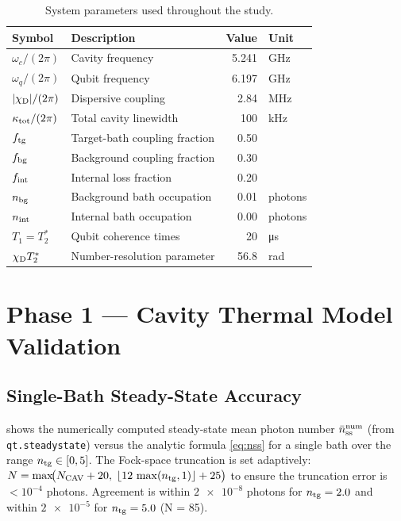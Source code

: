 \documentclass[11pt,a4paper]{article}
\newcommand{\nbar}{\bar{n}}
\newcommand{\kappat}{\kappa_{\rm tot}}
\newcommand{\ntg}{n_{\rm tg}}
\newcommand{\nbg}{n_{\rm bg}}
\newcommand{\nss}{\nbar_{\rm ss}}
\newcommand{\chiD}{\chi_{\rm D}}
\begin{document}
\begin{table}[ht]
\centering
\caption{System parameters used throughout the study.}
\label{tab:params}
\begin{tabular}{llrl}
\toprule
Symbol & Description & Value & Unit \\
\midrule
$\omega_c/(2\pi)$ & Cavity frequency & 5.241 & GHz \\
$\omega_q/(2\pi)$ & Qubit frequency  & 6.197 & GHz \\
$|\chiD|/(2\pi)$ & Dispersive coupling & 2.84 & MHz \\
$\kappat/(2\pi)$ & Total cavity linewidth & 100 & kHz \\
$f_{\rm tg}$     & Target-bath coupling fraction & 0.50 & \\
$f_{\rm bg}$     & Background coupling fraction  & 0.30 & \\
$f_{\rm int}$    & Internal loss fraction        & 0.20 & \\
$\nbg$           & Background bath occupation    & 0.01 & photons \\
$n_{\rm int}$    & Internal bath occupation      & 0.00 & photons \\
$T_1 = T_2^*$   & Qubit coherence times         & 20   & \si{\micro s} \\
$\chiD T_2^*$   & Number-resolution parameter   & 56.8 & rad \\
\bottomrule
\end{tabular}
\end{table}

\section{Phase 1 --- Cavity Thermal Model Validation}
\label{sec:phase1}

\subsection{Single-Bath Steady-State Accuracy}
\label{sec:ss_valid}

 shows the numerically computed steady-state mean photon
number $\nss^{\rm num}$ (from \texttt{qt.steadystate}) versus the analytic
formula \cref{eq:nss} for a single bath over the range $\ntg \in [0, 5]$.
The Fock-space truncation is set adaptively:
$N = \max\!\bigl(N_{\rm CAV} + 20,\; \lfloor12\,\max(\ntg,1)\rfloor + 25\bigr)$
to ensure the truncation error is $<10^{-4}$ photons.
Agreement is within $\num{2e-8}$ photons for $\ntg = 2.0$ and
within $\num{2e-5}$ for $\ntg = 5.0$ (N = 85).
\end{document}
